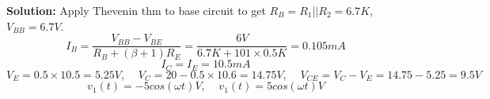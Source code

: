 \begin{enumerate}

{\bf Solution:} 
Apply Thevenin thm to base circuit to get $R_B=R_1 || R_2=6.7K$, $V_{BB}=6.7V$.
\[ I_B=\frac{V_{BB}-V_{BE}}{R_B+(\beta+1)R_E}=\frac{6V}{6.7K+101\times 0.5K}
	=0.105 mA \]
\[ I_C=I_E=10.5 mA \]
\[ V_E=0.5\times 10.5=5.25V,\;\;\;\; V_C=20-0.5\times 10.6=14.75V,\;\;\;\;
	V_{CE}=V_C-V_E=14.75-5.25=9.5V \]
\[ v_1(t)=-5 cos(\omega t) V,\;\;\;\;v_1(t)=5 cos(\omega t) V	\]

\end{enumerate}



